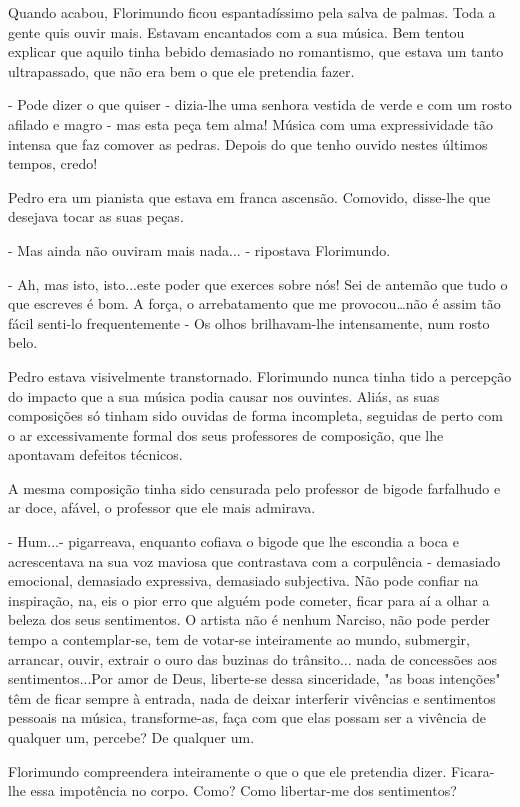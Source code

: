 Quando acabou, Florimundo ficou espantadíssimo pela salva de palmas.
Toda a gente quis ouvir mais. Estavam encantados com a sua música. Bem
tentou explicar que aquilo tinha bebido demasiado no romantismo, que
estava um tanto ultrapassado, que não era bem o que ele pretendia fazer.

- Pode dizer o que quiser - dizia-lhe uma senhora vestida de verde e com
um rosto afilado e magro - mas esta peça tem alma! Música com uma
expressividade tão intensa que faz comover as pedras. Depois do que
tenho ouvido nestes últimos tempos, credo!

Pedro era um pianista que estava em franca ascensão. Comovido, disse-lhe
que desejava tocar as suas peças.

- Mas ainda não ouviram mais nada... - ripostava Florimundo.

- Ah, mas isto, isto...este poder que exerces sobre nós! Sei de antemão
que tudo o que escreves é bom. A força, o arrebatamento que me
provocou\ldots{}não é assim tão fácil senti-lo frequentemente - Os olhos
brilhavam-lhe intensamente, num rosto belo.

Pedro estava visivelmente transtornado. Florimundo nunca tinha tido a
percepção do impacto que a sua música podia causar nos ouvintes. Aliás,
as suas composições só tinham sido ouvidas de forma incompleta, seguidas
de perto com o ar excessivamente formal dos seus professores de
composição, que lhe apontavam defeitos técnicos.

A mesma composição tinha sido censurada pelo professor de bigode
farfalhudo e ar doce, afável, o professor que ele mais admirava.

- Hum...- pigarreava, enquanto cofiava o bigode que lhe escondia a boca
e acrescentava na sua voz maviosa que contrastava com a corpulência -
demasiado emocional, demasiado expressiva, demasiado subjectiva. Não
pode confiar na inspiração, na, eis o pior erro que alguém pode cometer,
ficar para aí a olhar a beleza dos seus sentimentos. O artista não é
nenhum Narciso, não pode perder tempo a contemplar-se, tem de votar-se
inteiramente ao mundo, submergir, arrancar, ouvir, extrair o ouro das
buzinas do trânsito... nada de concessões aos sentimentos...Por amor de
Deus, liberte-se dessa sinceridade, "as boas intenções" têm de ficar
sempre à entrada, nada de deixar interferir vivências e sentimentos
pessoais na música, transforme-as, faça com que elas possam ser a
vivência de qualquer um, percebe? De qualquer um.

Florimundo compreendera inteiramente o que o que ele pretendia dizer.
Ficara-lhe essa impotência no corpo. Como? Como libertar-me dos
sentimentos?

